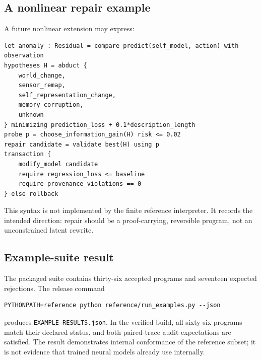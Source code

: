 \subsection{A nonlinear repair example}

A future nonlinear extension may express:
\begin{lstlisting}[style=osl]
let anomaly : Residual = compare predict(self_model, action) with observation
hypotheses H = abduct {
    world_change,
    sensor_remap,
    self_representation_change,
    memory_corruption,
    unknown
} minimizing prediction_loss + 0.1*description_length
probe p = choose_information_gain(H) risk <= 0.02
repair candidate = validate best(H) using p
transaction {
    modify_model candidate
    require regression_loss <= baseline
    require provenance_violations == 0
} else rollback
\end{lstlisting}
This syntax is not implemented by the finite reference interpreter.  It records
the intended direction: repair should be a proof-carrying, reversible program,
not an unconstrained latent rewrite.

\subsection{Example-suite result}

The packaged suite contains thirty-six accepted programs and seventeen expected
rejections.  The release command
\begin{verbatim}
PYTHONPATH=reference python reference/run_examples.py --json
\end{verbatim}
produces \texttt{EXAMPLE\_RESULTS.json}.  In the verified build, all sixty-six
programs match their declared status, and both paired-trace audit expectations
are satisfied.  The result demonstrates internal
conformance of the reference subset; it is not evidence that trained neural
models already use \OSLCore internally.
